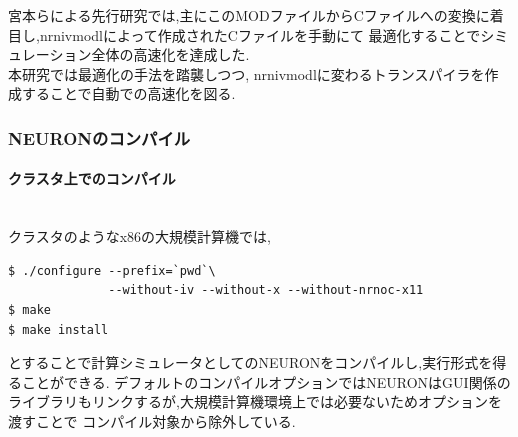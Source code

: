 宮本らによる先行研究\cite{miyamoto-master}では,主にこのMODファイルからCファイルへの変換に着目し,nrnivmodlによって作成されたCファイルを手動にて
最適化することでシミュレーション全体の高速化を達成した.\\
本研究では最適化の手法を踏襲しつつ, nrnivmodlに変わるトランスパイラを作成することで自動での高速化を図る.\\

\subsubsection{NEURONのコンパイル}
\paragraph{クラスタ上でのコンパイル}~\\
クラスタのようなx86の大規模計算機では,
{\footnotesize
\begin{lstlisting}[caption=クラスタでのNEURONのコンパイル,label=cluster-neuron-compile,numbers=none]
$ ./configure --prefix=`pwd`\
              --without-iv --without-x --without-nrnoc-x11
$ make
$ make install
\end{lstlisting}
}
とすることで計算シミュレータとしてのNEURONをコンパイルし,実行形式を得ることができる.
デフォルトのコンパイルオプションではNEURONはGUI関係のライブラリもリンクするが,大規模計算機環境上では必要ないためオプションを渡すことで
コンパイル対象から除外している.\\
